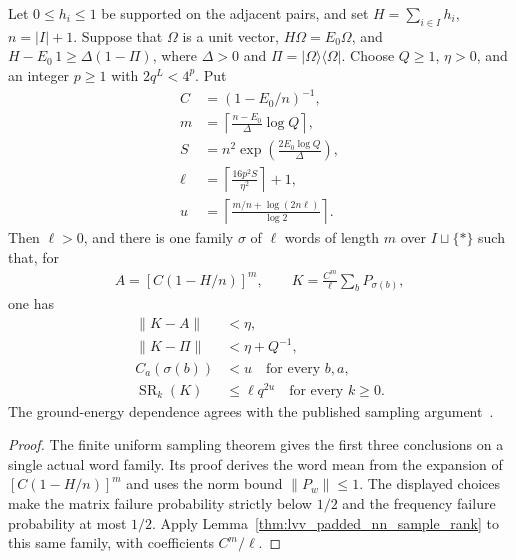 \begin{lemma}
    \label{thm:lvv_sampled_nn_power_rank}
    \leanok
    Let $0\le h_i\le1$ be supported on the adjacent pairs, and set
    $H=\sum_{i\in I}h_i$, $n=|I|+1$. Suppose that $\Omega$ is a unit vector,
    $H\Omega=E_0\Omega$, and
    $H-E_0\,1\ge\Delta(1-\Pi)$, where $\Delta>0$ and
    $\Pi=|\Omega\rangle\langle\Omega|$.
    Choose $Q\ge1$, $\eta>0$, and an integer $p\ge1$ with $2q^L<4^p$.
    Put
    \begin{align}
        C&=(1-E_0/n)^{-1},\\
        m&=\left\lceil\frac{n-E_0}{\Delta}\log Q\right\rceil,\\
        S&=n^2\exp\left(\frac{2E_0\log Q}{\Delta}\right),\\
        \ell&=\left\lceil\frac{16p^2S}{\eta^2}\right\rceil+1,\\
        u&=\left\lceil\frac{m/n+\log(2n\ell)}{\log2}\right\rceil.
        \label{eq:lvv_sampled_nn_power_parameters}
    \end{align}
    Then $\ell>0$, and there is one family $\sigma$ of $\ell$ words of length
    $m$ over $I\sqcup\{\ast\}$ such that, for
    \begin{align}
        A=[C(1-H/n)]^m,\qquad
        K=\frac{C^m}{\ell}\sum_bP_{\sigma(b)},
        \label{eq:lvv_sampled_nn_power_operator}
    \end{align}
    one has
    \begin{align}
        \|K-A\|&<\eta,\\
        \|K-\Pi\|&<\eta+Q^{-1},\\
        C_a(\sigma(b))&<u\quad\text{for every }b,a,\\
        \operatorname{SR}_k(K)&\le\ell q^{2u}\quad\text{for every }k\ge0.
        \label{eq:lvv_sampled_nn_power_conclusions}
    \end{align}
    The ground-energy dependence agrees with the published sampling
    argument~\cite[Methods, Proposition~1, p.~6]{Landau2015Published}.
\end{lemma}
\begin{proof}\leanok
    The finite uniform sampling theorem gives the first three conclusions
    on a single actual word family. Its proof derives the word mean from
    the expansion of $[C(1-H/n)]^m$ and uses the norm bound $\|P_w\|\le1$.
    The displayed choices make the matrix failure probability strictly
    below $1/2$ and the frequency failure probability at most $1/2$.
    Apply Lemma~\ref{thm:lvv_padded_nn_sample_rank} to this same family,
    with coefficients $C^m/\ell$.
\end{proof}

